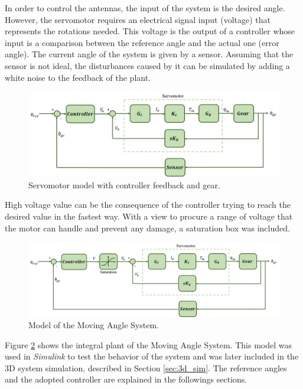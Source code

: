 In order to control the antennas, the input of the system is the desired angle. However, the servomotor requires an electrical signal input (voltage) that represents the rotations needed. This voltage is the output of a controller whose input is a comparison between the reference angle and the actual one (error angle). The current angle of the system is given by a sensor.
Assuming that the sensor is not ideal, the disturbances caused by it can be simulated by adding a white noise to the feedback of the plant.

\begin{figure}[H]
\centerline{
\includegraphics[scale=0.5]{figures/servo+gear+noise.png}}
\caption{Servomotor model with controller feedback and gear.}
\label{model4}
\end{figure}

High voltage value can be the consequence of the controller trying to reach the desired value in the fastest way. With a view to procure a range of voltage that the motor can handle and prevent any damage, a saturation box was included.

\begin{figure}[H]
\centerline{
\includegraphics[scale=0.4]{figures/complete_model.png}}
\caption{Model of the Moving Angle System.}
\label{model4}
\end{figure}

Figure \ref{model4} shows the integral plant of the Moving Angle System. This model was used in \emph{Simulink} to test the behavior of the system and was later included in the 3D system simulation, described in Section \ref{sec:3d_sim}. The reference angles and the adopted controller are explained in the followings sections.